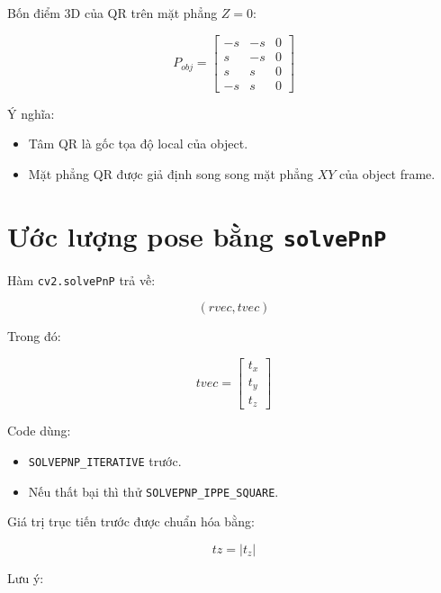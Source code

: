 \documentclass[12pt,a4paper]{article}
\begin{document}
Bốn điểm 3D của QR trên mặt phẳng $Z = 0$:

\begin{equation}
P_{obj} =
\begin{bmatrix}
-s & -s & 0 \\
 s & -s & 0 \\
 s &  s & 0 \\
-s &  s & 0
\end{bmatrix}
\end{equation}

Ý nghĩa:

\begin{itemize}
    \item Tâm QR là gốc tọa độ local của object.
    \item Mặt phẳng QR được giả định song song mặt phẳng $XY$ của object frame.
\end{itemize}

\section{Ước lượng pose bằng \texttt{solvePnP}}

Hàm \texttt{cv2.solvePnP} trả về:

\begin{equation}
(rvec, tvec)
\end{equation}

Trong đó:

\begin{equation}
tvec =
\begin{bmatrix}
t_x \\
t_y \\
t_z
\end{bmatrix}
\end{equation}

Code dùng:

\begin{itemize}
    \item \texttt{SOLVEPNP\_ITERATIVE} trước.
    \item Nếu thất bại thì thử \texttt{SOLVEPNP\_IPPE\_SQUARE}.
\end{itemize}

Giá trị trục tiến trước được chuẩn hóa bằng:

\begin{equation}
tz = |t_z|
\end{equation}

Lưu ý:
\end{document}
